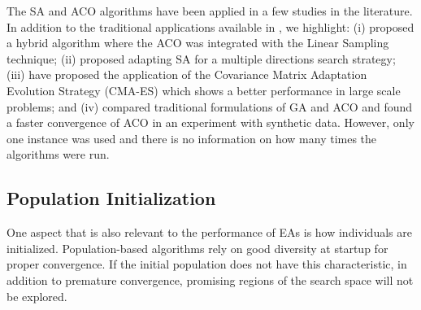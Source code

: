 			The SA and ACO algorithms have been applied in a few studies in the literature. In addition to the traditional applications available in \citep{caorsi1991microwave,garnero1991microwave}, we highlight: (i) \cite{brignone2008hybrid} proposed a hybrid algorithm where the ACO was integrated with the Linear Sampling technique; (ii) \cite{etminan2018electromagnetic} proposed adapting SA for a multiple directions search strategy; (iii) \cite{hajebi2022multiple} have proposed the application of the Covariance Matrix Adaptation Evolution Strategy (CMA-ES) which shows a better performance in large scale problems; and (iv) \cite{pastorino2010} compared traditional formulations of GA and ACO and found a faster convergence of ACO in an experiment with synthetic data. However, only one instance was used and there is no information on how many times the algorithms were run.
			
		\subsection{Population Initialization}\label{chap:methods:stochastic:initialization}
			
			One aspect that is also relevant to the performance of EAs is how individuals are initialized. Population-based algorithms rely on good diversity at startup for proper convergence. If the initial population does not have this characteristic, in addition to premature convergence, promising regions of the search space will not be explored.
			
